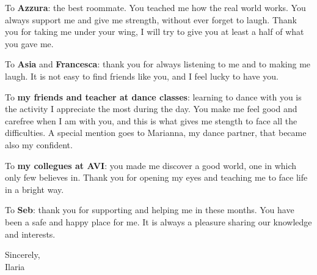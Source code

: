 To \textbf{Azzura}: the best roommate. You teached me how the real world works. You always support me and give me strength, without ever forget to laugh. Thank you for taking me under your wing, I will try to give you at least a half of what you gave me.
\vspace{0.5cm}

To \textbf{Asia} and \textbf{Francesca}: thank you for always listening to me and to making me laugh. It is not easy to find friends like you, and I feel lucky to have you.
\vspace{0.5cm}

To \textbf{my friends and teacher at dance classes}: learning to dance with you is the activity I appreciate the most during the day. You make me feel good and carefree when I am with you, and this is what gives me stength to face all the difficulties. A special mention goes to Marianna, my dance partner, that became also my confident.
\vspace{0.5cm}

To \textbf{my collegues at AVI}: you made me discover a good world, one in which only few believes in. Thank you for opening my eyes and teaching me to face life in a bright way. 
\vspace{0.5cm}

To \textbf{Seb}: thank you for supporting and helping me in these months. You have been a safe and happy place for me. It is always a pleasure sharing our knowledge and interests.
 
\begin{flushright}
	Sincerely,\\
	Ilaria
\end{flushright}

